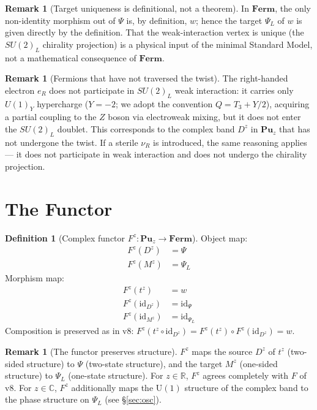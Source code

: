 \documentclass[11pt]{article}
\theoremstyle{plain}
\theoremstyle{definition}
\newtheorem{defn}[thm]{Definition}
\newtheorem{rem}[thm]{Remark}
\newcommand{\Cat}{\mathbf}
\begin{document}
\begin{rem}[Target uniqueness is definitional, not a theorem]\label{rem:targetbydef}
In $\Cat{Ferm}$, the only non-identity morphism out of $\Psi$ is, by
definition, $w$; hence the target $\Psi_L$ of $w$ is given directly by the
definition. That the weak-interaction vertex is unique (the $SU(2)_L$
chirality projection) is a physical input of the minimal Standard Model,
not a mathematical consequence of $\Cat{Ferm}$.
\end{rem}

\begin{rem}[Fermions that have not traversed the twist]\label{rem:untwisted}
The right-handed electron $e_R$ does not participate in $SU(2)_L$ weak
interaction: it carries only $U(1)_Y$ hypercharge ($Y=-2$; we adopt the
convention $Q = T_3 + Y/2$), acquiring a partial coupling to the $Z$ boson
via electroweak mixing, but it does not enter the $SU(2)_L$ doublet. This
corresponds to the complex band $D^z$ in $\Cat{Pu}_z$ that has not undergone
the twist. If a sterile $\nu_R$ is introduced, the same reasoning
applies --- it does not participate in weak interaction and does not
undergo the chirality projection.
\end{rem}

\section{The Functor}

\begin{defn}[Complex functor $F^z: \Cat{Pu}_z \to \Cat{Ferm}$]\label{def:functor}
Object map:
\begin{align*}
F^z(D^z) &= \Psi \\
F^z(M^z) &= \Psi_L
\end{align*}
Morphism map:
\begin{align*}
F^z(t^z) &= w \\
F^z(\mathrm{id}_{D^z}) &= \mathrm{id}_\Psi \\
F^z(\mathrm{id}_{M^z}) &= \mathrm{id}_{\Psi_L}
\end{align*}
Composition is preserved as in v8:
$F^z(t^z\circ\mathrm{id}_{D^z}) =
F^z(t^z)\circ F^z(\mathrm{id}_{D^z}) = w$.
\end{defn}

\begin{rem}[The functor preserves structure]\label{rem:preserve}
$F^z$ maps the source $D^z$ of $t^z$ (two-sided structure) to $\Psi$
(two-state structure), and the target $M^z$ (one-sided structure) to
$\Psi_L$ (one-state structure). For $z\in\mathbb{R}$, $F^z$ agrees
completely with $F$ of v8. For $z\in\mathbb{C}$, $F^z$ additionally maps
the $\mathrm{U}(1)$ structure of the complex band to the phase structure
on $\Psi_L$ (see \S\ref{sec:osc}).
\end{rem}
\end{document}
